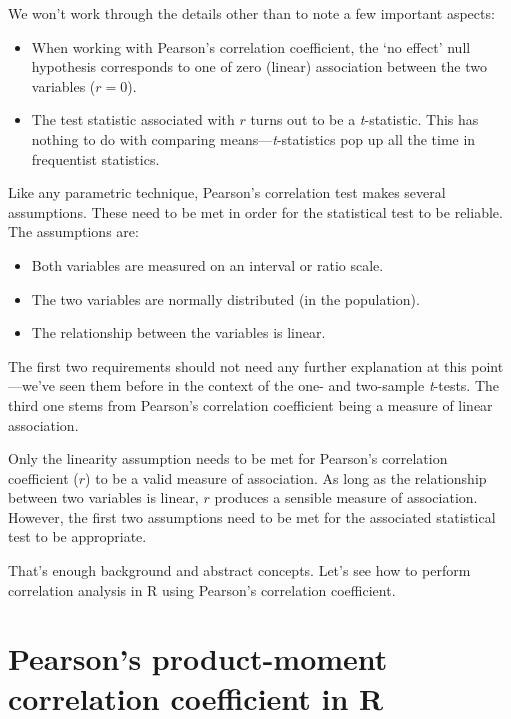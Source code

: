 \documentclass[
]{book}
\providecommand{\tightlist}{%
  \setlength{\itemsep}{0pt}\setlength{\parskip}{0pt}}
\begin{document}
We won't work through the details other than to note a few important aspects:

\begin{itemize}
\tightlist
\item
  When working with Pearson's correlation coefficient, the `no effect' null hypothesis corresponds to one of zero (linear) association between the two variables (\(r=0\)).
\item
  The test statistic associated with \(r\) turns out to be a \emph{t}-statistic. This has nothing to do with comparing means---\emph{t}-statistics pop up all the time in frequentist statistics.
\end{itemize}

Like any parametric technique, Pearson's correlation test makes several assumptions. These need to be met in order for the statistical test to be reliable. The assumptions are:

\begin{itemize}
\tightlist
\item
  Both variables are measured on an interval or ratio scale.
\item
  The two variables are normally distributed (in the population).
\item
  The relationship between the variables is linear.
\end{itemize}

The first two requirements should not need any further explanation at this point---we've seen them before in the context of the one- and two-sample \emph{t}-tests. The third one stems from Pearson's correlation coefficient being a measure of linear association.

Only the linearity assumption needs to be met for Pearson's correlation coefficient (\(r\)) to be a valid measure of association. As long as the relationship between two variables is linear, \(r\) produces a sensible measure of association. However, the first two assumptions need to be met for the associated statistical test to be appropriate.

That's enough background and abstract concepts. Let's see how to perform correlation analysis in R using Pearson's correlation coefficient.

\hypertarget{pearsons-product-moment-correlation-coefficient-in-r}{%
\section{Pearson's product-moment correlation coefficient in R}\label{pearsons-product-moment-correlation-coefficient-in-r}}
\end{document}
